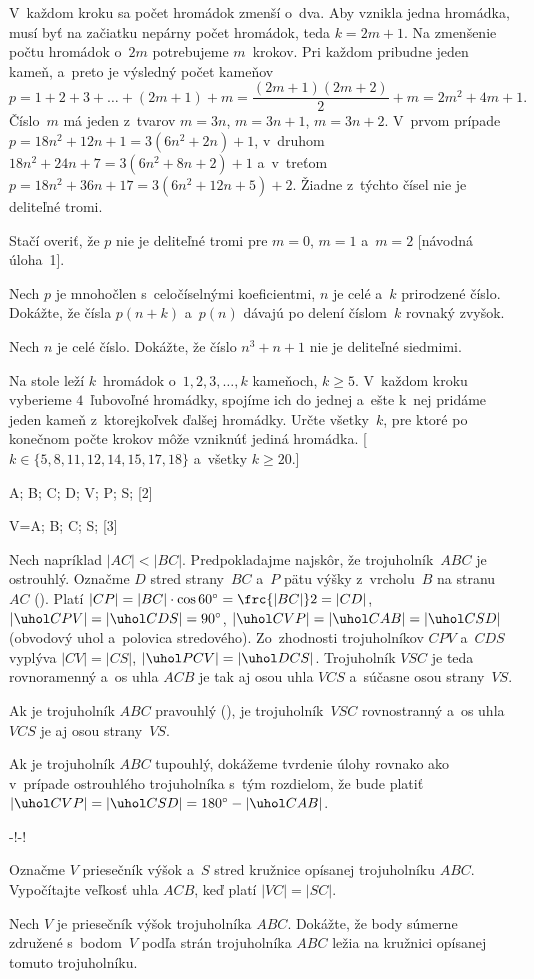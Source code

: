 {%
V~každom kroku sa počet hromádok zmenší o~dva.
Aby vznikla jedna hromádka, musí byť na začiatku nepárny počet
hromádok, teda $k=2m+1$. Na zmenšenie počtu hromádok o~$2m$ potrebujeme
$m$~krokov. Pri každom pribudne jeden kameň, a~preto je
výsledný počet kameňov
$$
p=1+2+3+\dots+(2m+1)+m=
\frac{(2m+1)(2m+2)}{2}+m=2m^2+4m+1.
$$
Číslo~$m$ má jeden z~tvarov $m=3n$, $m=3n+1$, $m=3n+2$. V~prvom
prípade $p=18n^2+12n+1=3(6n^2+2n)+1$, v~druhom
$18n^2+24n+7=3(6n^2+8n+2)+1$ a~v~treťom
$p=18n^2+36n+17=3(6n^2+12n+5)+2$. Žiadne z~týchto čísel nie je
deliteľné tromi.

\poznamka
Stačí overiť, že $p$ nie je deliteľné tromi pre $m=0$,
$m=1$ a~$m=2$ [návodná úloha~1].

Nech $p$ je mnohočlen s~celočíselnými koeficientmi, $n$ je celé
a~$k$ prirodzené číslo. Dokážte, že čísla $p(n+k)$ a~$p(n)$ dávajú
po delení číslom~$k$ rovnaký zvyšok.

Nech $n$ je celé číslo. Dokážte, že číslo $n^3+n+1$ nie je
deliteľné siedmimi.

Na stole leží $k$~hromádok o~$1,2,3,\dots,k$ kameňoch, $k\geq5$. 
V~každom kroku vyberieme $4$~ľubovoľné hromádky, spojíme ich do jednej
a~ešte k~nej pridáme jeden kameň z~ktorejkoľvek ďalšej hromádky.
Určte všetky~$k$, pre ktoré po konečnom počte krokov môže
vzniknúť jediná hromádka. [$k\in\{5,8,11,12,14,15,17,18\}$
a~všetky $k\ge20$.]
}

{%
\fontplace
\tpoint A; \tpoint B; \bpoint C; \lBpoint D;
\lBpoint V; \rBpoint P; \tpoint S;
[2] \hfil\Obr

\fontplace
\tpoint V=A; \tpoint B; \bpoint C; \lBpoint S;
[3] \hfil\Obr

Nech napríklad $|AC|<|BC|$. Predpokladajme najskôr, že
trojuholník~$ABC$ je ostrouhlý. Označme $D$ stred strany~$BC$
a~$P$ pätu výšky z~vrcholu~$B$ na stranu~$AC$ (\obr). Platí
$|CP|=|BC|\cdot \cos60^{\circ}= \frc{|BC|}2=|CD|$, $|\uhol
CPV|=|\uhol CDS|=90^{\circ}$, $|\uhol CVP|=|\uhol CAB|=|\uhol
CSD|$ (obvodový uhol a~polovica stredového). Zo~zhodnosti
trojuholníkov $CPV$ a~$CDS$ vyplýva $|CV|=|CS|$, $|\uhol
PCV|=|\uhol DCS|$. Trojuholník $VSC$ je teda rovnoramenný a~os
uhla $ACB$ je tak aj osou uhla $VCS$ a~súčasne osou strany~$VS$.

Ak je trojuholník $ABC$ pravouhlý (\obr), je trojuholník~$VSC$
rovnostranný a~os uhla $VCS$ je aj osou strany~$VS$.

Ak je trojuholník $ABC$ tupouhlý, dokážeme tvrdenie úlohy
rovnako ako v~prípade ostrouhlého trojuholníka s~tým rozdielom,
že bude platiť $|\uhol CVP|=|\uhol CSD|=180^{\circ}-|\uhol CAB|$.

\midinsert
\centerline{\inspicture-!\hss\inspicture-!}
\endinsert

Označme $V$ priesečník výšok a~$S$ stred kružnice opísanej
trojuholníku $ABC$. Vypočítajte veľkosť uhla $ACB$, keď
platí $|VC|=|SC|$.

Nech $V$ je priesečník výšok trojuholníka $ABC$. Dokážte, že body
súmerne združené s~bodom~$V$ podľa strán trojuholníka $ABC$
ležia na kružnici opísanej tomuto trojuholníku.
}

